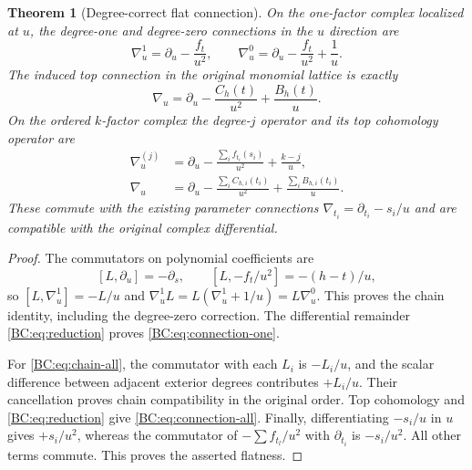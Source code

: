 \documentclass[11pt,a4paper]{article}
\newtheorem{theorem}{Theorem}[section]
\begin{document}
\begin{theorem}[Degree-correct flat connection]
On the one-factor complex localized at $u$, the degree-one and
degree-zero connections in the $u$ direction are
\begin{equation}
 \nabla_u^1=\partial_u-\frac{f_t}{u^2},\qquad
 \nabla_u^0=\partial_u-\frac{f_t}{u^2}+\frac1u.
 \label{BC:eq:chain-one}
\end{equation}
The induced top connection in the original monomial lattice is exactly
\begin{equation}
 \boxed{\nabla_u=\partial_u-\frac{C_h(t)}{u^2}
                                  +\frac{B_h(t)}u.}
 \label{BC:eq:connection-one}
\end{equation}
On the ordered $k$-factor complex the degree-$j$ operator and its top
cohomology operator are
\begin{align}
 \nabla_u^{(j)}&=\partial_u-
       \frac{\sum_i f_{t_i}(s_i)}{u^2}+\frac{k-j}{u},
       \label{BC:eq:chain-all}\\
 \boxed{\nabla_u}&=\boxed{\partial_u-
       \frac{\sum_i C_{h,i}(t_i)}{u^2}
                +\frac{\sum_i B_{h,i}(t_i)}u.}
       \label{BC:eq:connection-all}
\end{align}
These commute with the existing parameter connections
$\nabla_{t_i}=\partial_{t_i}-s_i/u$ and are compatible with the
original complex differential.
\end{theorem}
\begin{proof}
The commutators on polynomial coefficients are
\[
 [L,\partial_u]=-\partial_s,\qquad
 [L,-f_t/u^2]=-(h-t)/u,
\]
so $[L,\nabla_u^1]=-L/u$ and
$\nabla_u^1L=L(\nabla_u^1+1/u)=L\nabla_u^0$.
This proves the chain identity, including the degree-zero correction.
The differential remainder \eqref{BC:eq:reduction} proves
\eqref{BC:eq:connection-one}.

For \eqref{BC:eq:chain-all}, the commutator with each $L_i$ is
$-L_i/u$, and the scalar difference between adjacent exterior degrees
contributes $+L_i/u$.  Their cancellation proves chain compatibility
in the original order.  Top cohomology and
\eqref{BC:eq:reduction} give \eqref{BC:eq:connection-all}.
Finally, differentiating $-s_i/u$ in $u$ gives $+s_i/u^2$, whereas
the commutator of $-\sum f_{t_l}/u^2$ with $\partial_{t_i}$ is
$-s_i/u^2$.  All other terms commute.  This proves the asserted
flatness.
\end{proof}
\end{document}
